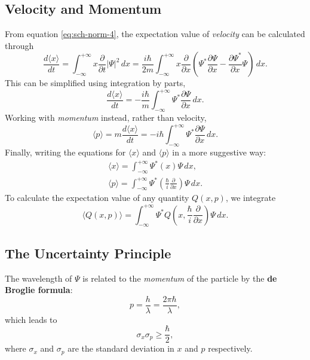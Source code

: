 \documentclass{article}
\begin{document}
\subsection{Velocity and Momentum}

From equation \eqref{eq:sch-norm-4}, the expectation value of \emph{velocity}
can be calculated through \[
  \frac{d\langle x \rangle}{dt}
  = \int_{-\infty}^{+\infty} x \frac{\partial}{\partial t} |\Psi|^2 \,dx
  = \frac{i\hbar}{2m} \int_{-\infty}^{+\infty} x\frac{\partial}{\partial x}
  \left(
    \Psi^*\frac{\partial \Psi}{\partial x} -
    \frac{\partial \Psi^*}{\partial x}\Psi
  \right) \,dx.
\]
This can be simplified using integration by parts, \[
  \frac{d\langle x \rangle}{dt}
  = -\frac{i\hbar}{m} \int_{-\infty}^{+\infty} \Psi^*
  \frac{\partial \Psi}{\partial x} \,dx.
\]
Working with \emph{momentum} instead, rather than velocity, \[
  \langle p \rangle
  = m \frac{d \langle x \rangle}{dt}
  = -i\hbar \int_{-\infty}^{+\infty}
    \Psi^*\frac{\partial \Psi}{\partial x}
  \,dx.
\]
Finally, writing the equations for $\langle x \rangle$ and $\langle p \rangle$
in a more suggestive way:
\begin{gather}
  \label{eq:sch-vel}
  \langle x \rangle = \int_{-\infty}^{+\infty} \Psi^* (x) \Psi \,dx, \\
  \label{eq:sch-mom}
  \langle p \rangle
  = \int_{-\infty}^{+\infty} \Psi^*\left(
    \frac{\hbar}{i} \frac{\partial}{\partial x}
  \right)\Psi \,dx.
\end{gather}
To calculate the expectation value of any quantity $Q(x, p)$, we integrate
\begin{equation} \label{eq:sch-qty}
  \boxed{
    \langle Q(x, p) \rangle = \int_{-\infty}^{+\infty} \Psi^* Q\left(
      x, \frac{\hbar}{i}\frac{\partial}{\partial x}
    \right)\Psi \,dx.
  }
\end{equation}

\subsection{The Uncertainty Principle}

The wavelength of $\Psi$ is related to the \emph{momentum} of the particle by
the \textbf{de Broglie formula}:
\begin{equation} \label{eq:de-brog}
  p = \frac{h}{\lambda} = \frac{2\pi\hbar}{\lambda},
\end{equation}
which leads to
\begin{equation} \label{eq:unc-prin}
  \boxed{
    \sigma_x \sigma_p \geq \frac{\hbar}{2},
  }
\end{equation}
where $\sigma_x$ and $\sigma_p$ are the standard deviation in $x$ and $p$
respectively.
\end{document}
